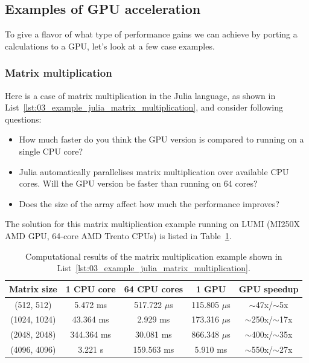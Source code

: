 

\subsection{Examples of GPU acceleration}

\par
To give a flavor of what type of performance gains we can achieve by porting a calculations to a GPU, let’s look at a few case examples.


\subsubsection{Matrix multiplication}


\par
Here is a case of matrix multiplication in the Julia language, as shown in List~\ref{lst:03_example_julia_matrix_multiplication}, and consider following questions:
\begin{itemize}
    \item How much faster do you think the GPU version is compared to running on a single CPU core?
    \item Julia automatically parallelises matrix multiplication over available CPU cores. Will the GPU version be faster than running on 64 cores?
    \item Does the size of the array affect how much the performance improves?
\end{itemize}





\par
The solution for this matrix multiplication example running on LUMI (MI250X AMD GPU, 64-core AMD Trento CPUs) is listed in Table~\ref{tbl:example_julia_matrix_multiplication}.


\begin{table}[h]
\centering\caption{Computational results of the matrix multiplication example shown in List~\ref{lst:03_example_julia_matrix_multiplication}.}\label{tbl:example_julia_matrix_multiplication}
\begin{tabular}{ |c|c|c|c|c| } 
\hline
\textbf{Matrix size} & \textbf{1 CPU core} & \textbf{64 CPU cores} & \textbf{1 GPU} & \textbf{GPU speedup} \\
\hline
(512, 512) &     5.472 ms & 517.722 $\mu$s & 115.805 $\mu$s & $\sim$47x/$\sim$5x \\
(1024, 1024) &  43.364 ms & 2.929     ms   & 173.316 $\mu$s & $\sim$250x/$\sim$17x \\
(2048, 2048) & 344.364 ms & 30.081    ms   & 866.348 $\mu$s & $\sim$400x/$\sim$35x \\
(4096, 4096) &   3.221  s & 159.563   ms   & 5.910  ms      & $\sim$550x/$\sim$27x \\
\hline
\end{tabular}
\end{table}


